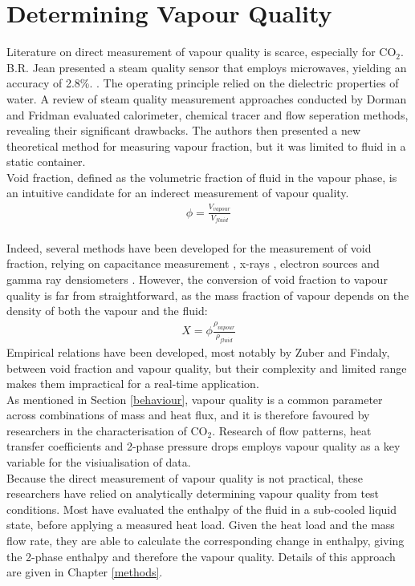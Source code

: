 \documentclass{report}
\begin{document}
\section{Determining Vapour Quality}
Literature on direct measurement of vapour quality is scarce, especially for CO$_2$. B.R. Jean presented a steam quality sensor that employs microwaves, yielding an accuracy of 2.8\%. \cite{Jean 2007}. The operating principle relied on the dielectric properties of water. A review of steam quality measurement approaches conducted by Dorman and Fridman \cite{Dorfman 2006} evaluated calorimeter, chemical tracer and flow seperation methods, revealing their significant drawbacks. The authors then presented a new theoretical method for measuring vapour fraction, but it was limited to fluid in a static container. \\
Void fraction, defined as the volumetric fraction of fluid in the vapour phase, is an intuitive candidate for an inderect measurement of vapour quality. 
\begin{eqnarray}
\phi =\frac{V_{vapour}}{V_{fluid}}
\end{eqnarray}\\
Indeed, several methods have been developed for the measurement of void fraction, relying on capacitance measurement \cite{Beker 2005}, x-rays \cite{Bauer 2012}, electron sources \cite{Augyrond 2001} and gamma ray densiometers \cite{Zhao 2013}. However, the conversion of void fraction to vapour quality is far from straightforward, as the mass fraction of vapour depends on the density of both the vapour and the fluid:
\begin{eqnarray}
X =\phi\frac{\rho_{vapour}}{\rho_{fluid}}
\end{eqnarray}
Empirical relations have been developed, most notably by Zuber and Findaly, between void fraction and vapour quality, but their complexity and limited range makes them impractical for a real-time application.\cite{lecture}\\
As mentioned in Section \ref{behaviour}, vapour quality is a common parameter across combinations of mass and heat flux, and it is therefore favoured by researchers in the characterisation of CO$_2$. Research of flow patterns, heat transfer coefficients and 2-phase pressure drops employs vapour quality as a key variable for the visiualisation of data. \cite{Cheng 2008}\cite{Mastrullo 2009a}\\
Because the direct measurement of vapour quality is not practical, these researchers have relied on analytically determining vapour quality from test conditions. Most have evaluated the enthalpy of the fluid in a sub-cooled liquid state, before applying a measured heat load. Given the heat load and the mass flow rate, they are able to calculate the corresponding change in enthalpy, giving the 2-phase enthalpy and therefore the vapour quality. \cite{Mastrullo 2009c} \cite{Wu 2011} \cite{Yun 2005} Details of this approach are given in Chapter \ref{methods}.
\end{document}
